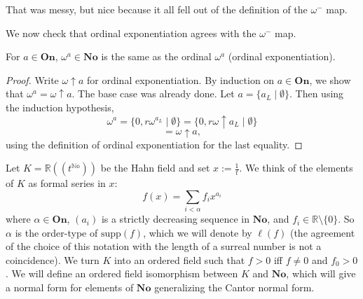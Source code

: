 That was messy, but nice because it all fell out of the definition of the $\omega^-$ map.

We now check that ordinal exponentiation agrees with the $\omega^-$ map.

\begin{lemma} %
For $a\in\mathbf{On}$, $\omega^a\in\mathbf{No}$ is the same as the ordinal $\omega^a$ (ordinal exponentiation).
 \end{lemma}

\begin{proof} %
Write $\omega\uparrow a$ for ordinal exponentiation. By induction on $a\in \mathbf{On}$, we show that $\omega^a=\omega\uparrow a$. The base case was already done. Let $a=\{a_L\mid \emptyset\}$. Then using the induction hypothesis,
$$\omega^a=\{0,r\omega^{a_L}\mid \emptyset\}=\{0,r\omega\uparrow a_L\mid\emptyset\}$$
$$=\omega\uparrow a,$$
using the definition of ordinal exponentiation for the last equality.
 \end{proof}


Let $K=\mathbb{R}((t^\mathbb{No}))$ be the Hahn field and set $x:=\frac{1}{t}$. We think of the elements of $K$ as formal series in $x$:
$$f(x)=\sum_{i<\alpha}f_ix^{a_i}$$
where $\alpha\in \mathbf{On}$, $(a_i)$ is a strictly decreasing sequence in $\mathbf{No}$, and $f_i\in \mathbb{R}\setminus \{0\}$. So $\alpha$ is the order-type of $\mathrm{supp}(f)$, which we will denote by $\ell(f)$ (the agreement of the choice of this notation with the length of a surreal number is not a coincidence). We turn $K$ into an ordered field such that $f>0$ iff $f\neq 0$ and $f_0>0$. We will define an ordered field isomorphism between $K$ and $\mathbf{No}$, which will give a normal form for elements of $\mathbf{No}$ generalizing the Cantor normal form.
